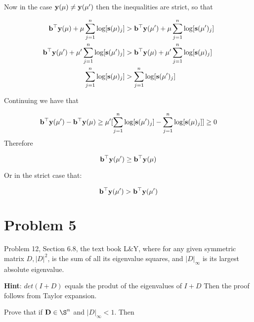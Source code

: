 \documentclass[answers]{exam} %
\newcommand{\B}[1]{\mathbf{#1}}
\renewcommand\b{{\bf b}}
\renewcommand\b{{\bf b}}
\newcommand\y{{\bf y}}
\newcommand\s{{\bf s}}
\begin{document}
\begin{itemize}
\begin{framed}
Now in the case $\y(\mu) \neq \y(\mu')$ then the inequalities are strict, so that 

\begin{equation*}
\begin{aligned}
\b^{\top} \y(\mu)  + \mu \sum_{j=1}^{n} \log[\s(\mu)_j] &> \b^{\top} \y(\mu')  + \mu \sum_{j=1}^{n} \log[\s(\mu')_j] \\
\b^{\top} \y(\mu')  + \mu' \sum_{j=1}^{n} \log[\s(\mu')_j] &> \b^{\top} \y(\mu)  + \mu' \sum_{j=1}^{n} \log[\s(\mu
)_j] \\ 
\sum_{j=1}^{n} \log[\s(\mu)_j]  &>  \sum_{j=1}^{n} \log[\s(\mu')_j]
\end{aligned}
\end{equation*}

Continuing we have that 


\begin{equation*}
\begin{aligned}
\b^{\top} \y(\mu')  - \b^{\top} \y(\mu)   & \geq    \mu' [ \sum_{j=1}^{n} \log[\s(\mu')_j]  -  \sum_{j=1}^{n} \log[\s(\mu)_j] ] \geq 0 \\
\end{aligned}
\end{equation*}
Therefore 

\[
\b^{\top} \y(\mu')  \geq \b^{\top} \y(\mu)   
\]


Or in the strict case that:

\[
\b^{\top} \y(\mu')  >  \b^{\top} \y(\mu')
\]



\end{framed}
\end{itemize}
\section*{Problem 5}

Problem 12, Section 6.8, the text book L$\&$Y, where for any given symmetric matrix $D,|D|^2$, is the sum of all its eigenvalue squares, and $|D|_{\infty}$ is its largest absolute eigenvalue.

\textbf{Hint}: $det(I + D)$ equals the produt of the eigenvalues of $I + D$ Then the proof follows from Taylor expansion. 


Prove that if $\B{D} \in \S^n$ and $|D|_{\infty} < 1$. Then 
\end{document}
